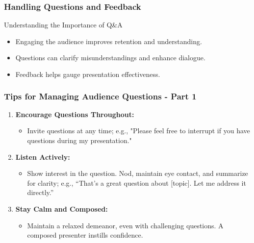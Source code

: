 \documentclass{beamer}
\begin{document}
\begin{frame}[fragile]
    \frametitle{Handling Questions and Feedback}
    \begin{block}{Understanding the Importance of Q\&A}
        \begin{itemize}
            \item Engaging the audience improves retention and understanding.
            \item Questions can clarify misunderstandings and enhance dialogue.
            \item Feedback helps gauge presentation effectiveness.
        \end{itemize}
    \end{block}
\end{frame}

\begin{frame}[fragile]
    \frametitle{Tips for Managing Audience Questions - Part 1}
    \begin{enumerate}
        \item \textbf{Encourage Questions Throughout:}
            \begin{itemize}
                \item Invite questions at any time; e.g., "Please feel free to interrupt if you have questions during my presentation."
            \end{itemize}

        \item \textbf{Listen Actively:}
            \begin{itemize}
                \item Show interest in the question. Nod, maintain eye contact, and summarize for clarity; e.g., “That’s a great question about [topic]. Let me address it directly.”
            \end{itemize}

        \item \textbf{Stay Calm and Composed:}
            \begin{itemize}
                \item Maintain a relaxed demeanor, even with challenging questions. A composed presenter instills confidence.
            \end{itemize}
    \end{enumerate}
\end{frame}
\end{document}
